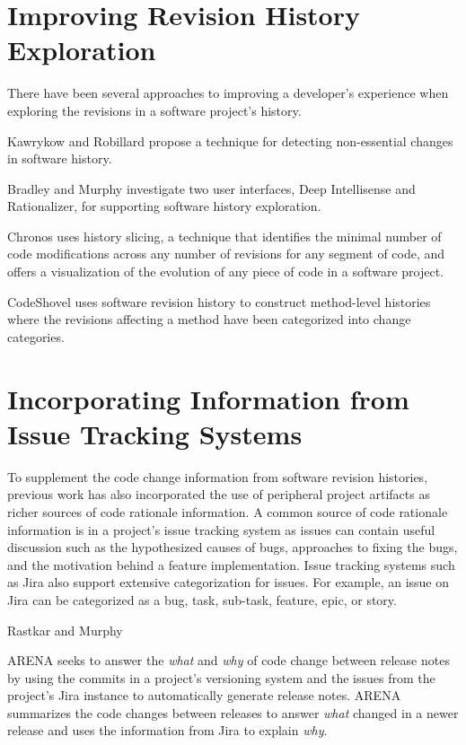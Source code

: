 \section{Improving Revision History Exploration}

There have been several approaches to improving a developer's experience when exploring the revisions in a software project's history.

Kawrykow and Robillard \cite{kawrykow_non-essential_2011} propose a technique for detecting non-essential changes in software history.

Bradley and Murphy \cite{bradley_supporting_2011} investigate two user interfaces, Deep Intellisense and Rationalizer, for supporting software history exploration.

Chronos \cite{servant_history_2012} uses history slicing, a technique that identifies the minimal number of code modifications across any number of revisions for any segment of code, and offers a visualization of the evolution of any piece of code in a software project.

CodeShovel \cite{grund_codeshovel_2021} uses software revision history to construct method-level histories where the revisions affecting a method have been categorized into change categories.

\section{Incorporating Information from Issue Tracking Systems}

To supplement the code change information from software revision histories, previous work has also incorporated the use of peripheral project artifacts as richer sources of code rationale information. A common source of code rationale information is in a project's issue tracking system as issues can contain useful discussion such as the hypothesized causes of bugs, approaches to fixing the bugs, and the motivation behind a feature implementation. 
Issue tracking systems such as Jira also support extensive categorization for issues.
For example, an issue on Jira can be categorized as a bug, task, sub-task, feature, epic, or story. 

Rastkar and Murphy \cite{rastkar_why_2013}

ARENA \cite{moreno_arena_2017} seeks to answer the \emph{what} and \emph{why} of code change between release notes by using the commits in a project's versioning system and the issues from the project's Jira instance to automatically generate release notes. 
ARENA summarizes the code changes between releases to answer \emph{what} changed in a newer release and uses the information from Jira to explain \emph{why}.

